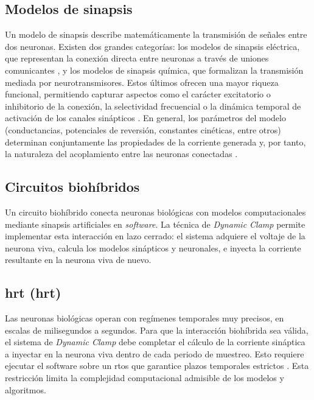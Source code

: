 \subsection{Modelos de sinapsis\label{SS:MODELOSINAPSIS}}

Un modelo de sinapsis describe matemáticamente la transmisión de señales entre dos neuronas. Existen dos grandes categorías: los modelos de sinapsis eléctrica, que representan la conexión directa entre neuronas a través de uniones comunicantes \cite{GurelKazanci2007}, y los modelos de sinapsis química, que formalizan la transmisión mediada por neurotransmisores. Estos últimos ofrecen una mayor riqueza funcional, permitiendo capturar aspectos como el carácter excitatorio o inhibitorio de la conexión, la selectividad frecuencial \cite{TsodyksMarkram1998} o la dinámica temporal de activación de los canales sinápticos \cite{Destexhe1994}. En general, los parámetros del modelo (conductancias, potenciales de reversión, constantes cinéticas, entre otros) determinan conjuntamente las propiedades de la corriente generada y, por tanto, la naturaleza del acoplamiento entre las neuronas conectadas \cite{Golowasch1999}.

\subsection{Circuitos biohíbridos\label{SS:CIRCUITOBIOHIBRIDO}}

Un circuito biohíbrido conecta neuronas biológicas con modelos computacionales mediante sinapsis artificiales en \textit{software}. La técnica de \textit{Dynamic Clamp} \cite{Sharp1993a, Patel2017, Amaducci2019, Reyes-Sanchez2020} permite implementar esta interacción en lazo cerrado: el sistema adquiere el voltaje de la neurona viva, calcula los modelos sinápticos y neuronales, e inyecta la corriente resultante en la neurona viva de nuevo.

\subsection{\acl{hrt} (\acs{hrt})\label{SS:TIEMPOREAL}}

Las neuronas biológicas operan con regímenes temporales muy precisos, en escalas de milisegundos a segundos. Para que la interacción biohíbrida sea válida, el sistema de \textit{Dynamic Clamp} debe completar el cálculo de la corriente sináptica a inyectar en la neurona viva dentro de cada periodo de muestreo. Esto requiere ejecutar el software sobre un \ac{rtos} que garantice plazos temporales estrictos \cite{Buttazzo2011, Patel2017, Amaducci2019}. Esta restricción limita la complejidad computacional admisible de los modelos y algoritmos.

